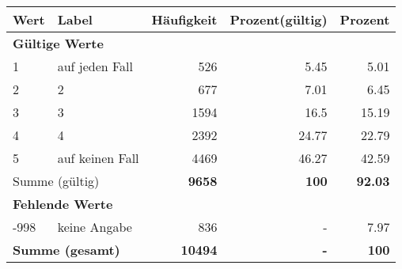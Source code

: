      \begin{longtable}{lXrrr}
     \toprule
     \textbf{Wert} & \textbf{Label} & \textbf{Häufigkeit} & \textbf{Prozent(gültig)} & \textbf{Prozent} \\
     \endhead
     \midrule
     \multicolumn{5}{l}{\textbf{Gültige Werte}}\\

     1 &
     \multicolumn{1}{X}{ auf jeden Fall   } &


       \num{526} &
       \num[round-mode=places,round-precision=2]{5,45} &
         \num[round-mode=places,round-precision=2]{5,01} \\

     2 &
     \multicolumn{1}{X}{ 2   } &


       \num{677} &
       \num[round-mode=places,round-precision=2]{7,01} &
         \num[round-mode=places,round-precision=2]{6,45} \\

     3 &
     \multicolumn{1}{X}{ 3   } &


       \num{1594} &
       \num[round-mode=places,round-precision=2]{16,5} &
         \num[round-mode=places,round-precision=2]{15,19} \\

     4 &
     \multicolumn{1}{X}{ 4   } &


       \num{2392} &
       \num[round-mode=places,round-precision=2]{24,77} &
         \num[round-mode=places,round-precision=2]{22,79} \\

     5 &
     \multicolumn{1}{X}{ auf keinen Fall   } &


       \num{4469} &
       \num[round-mode=places,round-precision=2]{46,27} &
         \num[round-mode=places,round-precision=2]{42,59} \\
     \midrule
     \multicolumn{2}{l}{Summe (gültig)} &
       \textbf{\num{9658}} &
     \textbf{100} &
       \textbf{\num[round-mode=places,round-precision=2]{92,03}} \\
     \multicolumn{5}{l}{\textbf{Fehlende Werte}}\\
       -998 &
       keine Angabe &
         \num{836} &
        - &
         \num[round-mode=places,round-precision=2]{7,97} \\
     \midrule
     \multicolumn{2}{l}{\textbf{Summe (gesamt)}} &
          \textbf{\num{10494}} &
        \textbf{-} &
        \textbf{100} \\
     \bottomrule
     \end{longtable}
     
